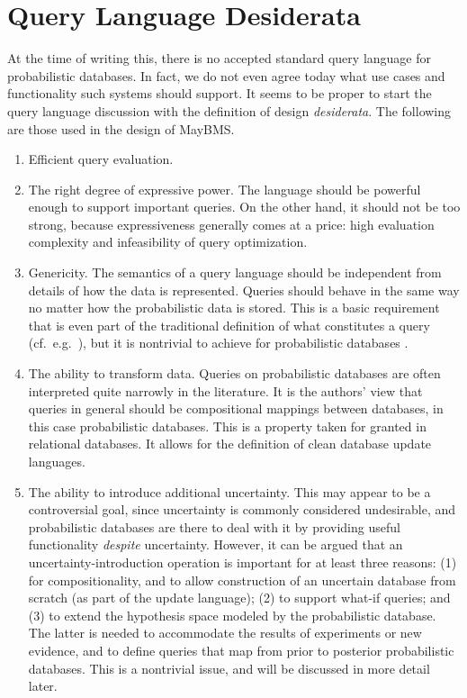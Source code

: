 \section{Query Language Desiderata}
\label{sect:desiderata}


At the time of writing this, there is no accepted standard query language for probabilistic databases. In fact, we do not even agree today what use cases and functionality such systems should support.
It seems to be proper to start the query language discussion with the definition of design
{\em desiderata}\/. The following are those used in the design of MayBMS.
%
\begin{enumerate}
\item
Efficient query evaluation.

\item
The right degree of expressive power. The language should be powerful enough to support important queries. On the other hand, it should not be too strong, because expressiveness generally comes at a price: high evaluation complexity and infeasibility of query optimization.

\item
Genericity. The semantics of a query language should be independent from details of how the data is represented. Queries should behave in the same way no matter how the probabilistic data is stored. This is a basic requirement that is even part of the traditional definition of what constitutes a query (cf.\ e.g.\ \cite{AHV95}), but it is nontrivial to achieve for probabilistic databases \cite{AKO07ISQL}.

\item
The ability to transform data.
Queries on probabilistic databases are often interpreted quite narrowly in the literature.
%
%
It is the authors' view that queries in general should be compositional mappings between databases, in this case probabilistic databases. This is a property taken for granted in relational databases. It allows for the definition of clean database update languages.

\item
The ability to introduce additional uncertainty.
This may appear to be a controversial goal, since uncertainty is commonly considered undesirable, and probabilistic databases are there to deal with it by providing useful functionality {\em despite}\/ uncertainty.
However, it can be argued that an uncertainty-introduction operation is important for at least three reasons:
(1)  for compositionality, and to allow construction of an uncertain database from scratch (as part of the update language);
(2) to support what-if queries; and
(3) to extend the hypothesis space modeled by the probabilistic database. The latter is needed to accommodate the results of experiments or new evidence, and to define queries that map from prior to posterior probabilistic databases. This is a nontrivial issue, and will be discussed in more detail later.
\end{enumerate}



